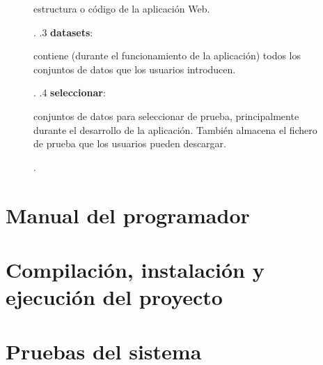\begin{figure}[H]
{\begin{minipage}[t]{10cm}
        estructura o código de la aplicación Web{.}\\
    \end{minipage}.
    .3 \textbf{datasets}: \begin{minipage}[t]{10cm}
        contiene (durante el funcionamiento de la aplicación) todos los conjuntos de
        datos que los usuarios introducen{.}\\
    \end{minipage}.
    .4 \textbf{seleccionar}: \begin{minipage}[t]{10cm}
        conjuntos de datos para seleccionar de prueba, principalmente
        durante el desarrollo de la aplicación{.} También almacena el fichero de
        prueba que los usuarios pueden descargar{.}\\
    \end{minipage}.
}
\end{figure}

\begin{figure}[H]
    \end{figure}

\section{Manual del programador}

\section{Compilación, instalación y ejecución del proyecto}

\section{Pruebas del sistema}

